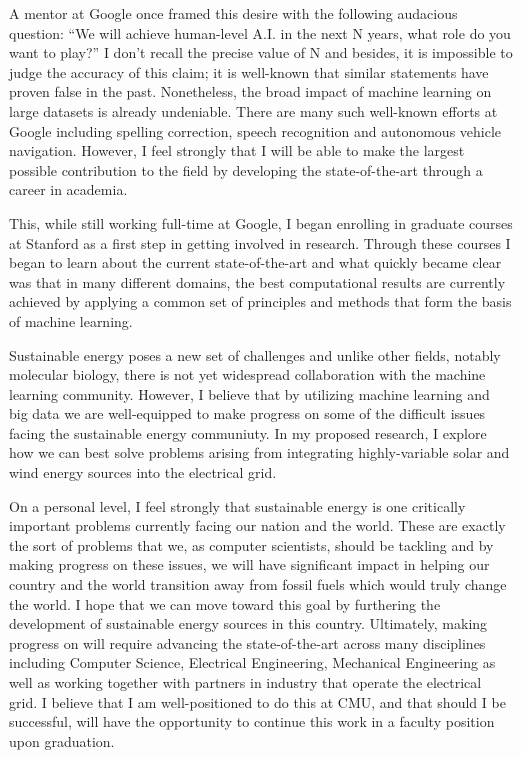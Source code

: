 \documentclass[12pt]{article}
\begin{document}
A mentor at Google once framed this desire with the following audacious question: ``We will achieve human-level A.I. in the next N years, what role do you want to play?'' I don't recall the precise value of N  and besides, it is impossible to judge the accuracy of this claim; it is well-known that similar statements have proven false in the past. Nonetheless, the broad impact of machine learning on large datasets is already undeniable. There are many such well-known efforts at Google including spelling correction, speech recognition and autonomous vehicle navigation. However, I feel strongly that I will be able to make the largest possible contribution to the field by developing the state-of-the-art through a career in academia.

This, while still working full-time at Google, I began enrolling in graduate courses at Stanford as a first step in getting involved in research. Through these courses I began to learn about the current state-of-the-art and what quickly became clear was that in many different domains, the best computational results are currently achieved by applying a common set of principles and methods that form the basis of machine learning.

Sustainable energy poses a new set of challenges and unlike other fields, notably molecular biology, there is not yet widespread collaboration with the machine learning community. However, I believe that by utilizing machine learning and big data we are well-equipped to make progress on some of the difficult issues facing the sustainable energy communiuty. In my proposed research, I explore how we can best solve problems arising from integrating highly-variable solar and wind energy sources into the electrical grid. 

On a personal level, I feel strongly that sustainable energy is one critically important problems currently facing our nation and the world. These are exactly the sort of problems that we, as computer scientists, should be tackling and by making progress on these issues, we will have significant impact in helping our country and the world transition away from fossil fuels which would truly change the world. I hope that we can move toward this goal by furthering the development of sustainable energy sources in this country. Ultimately, making progress on will require advancing the state-of-the-art across many disciplines including Computer Science, Electrical Engineering, Mechanical Engineering as well as working together with partners in industry that operate the electrical grid. I believe that I am well-positioned to do this at CMU, and that should I be successful, will have the opportunity to continue this work in a faculty position upon graduation.
\end{document}
